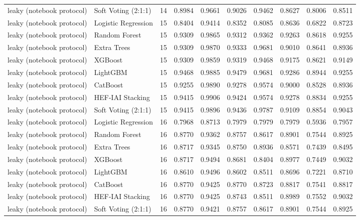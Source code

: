 \begin{tabular}{llrrrrrrrr}
leaky (notebook protocol) & Soft Voting (2:1:1) & 14 & 0.8984 & 0.9661 & 0.9026 & 0.9462 & 0.8627 & 0.8006 & 0.8511 \\
leaky (notebook protocol) & Logistic Regression & 15 & 0.8404 & 0.9414 & 0.8352 & 0.8085 & 0.8636 & 0.6822 & 0.8723 \\
leaky (notebook protocol) & Random Forest & 15 & 0.9309 & 0.9865 & 0.9312 & 0.9362 & 0.9263 & 0.8618 & 0.9255 \\
leaky (notebook protocol) & Extra Trees & 15 & 0.9309 & 0.9870 & 0.9333 & 0.9681 & 0.9010 & 0.8641 & 0.8936 \\
leaky (notebook protocol) & XGBoost & 15 & 0.9309 & 0.9859 & 0.9319 & 0.9468 & 0.9175 & 0.8621 & 0.9149 \\
leaky (notebook protocol) & LightGBM & 15 & 0.9468 & 0.9885 & 0.9479 & 0.9681 & 0.9286 & 0.8944 & 0.9255 \\
leaky (notebook protocol) & CatBoost & 15 & 0.9255 & 0.9890 & 0.9278 & 0.9574 & 0.9000 & 0.8528 & 0.8936 \\
leaky (notebook protocol) & HEF-IAI Stacking & 15 & 0.9415 & 0.9906 & 0.9424 & 0.9574 & 0.9278 & 0.8834 & 0.9255 \\
leaky (notebook protocol) & Soft Voting (2:1:1) & 15 & 0.9415 & 0.9896 & 0.9436 & 0.9787 & 0.9109 & 0.8854 & 0.9043 \\
leaky (notebook protocol) & Logistic Regression & 16 & 0.7968 & 0.8713 & 0.7979 & 0.7979 & 0.7979 & 0.5936 & 0.7957 \\
leaky (notebook protocol) & Random Forest & 16 & 0.8770 & 0.9362 & 0.8757 & 0.8617 & 0.8901 & 0.7544 & 0.8925 \\
leaky (notebook protocol) & Extra Trees & 16 & 0.8717 & 0.9345 & 0.8750 & 0.8936 & 0.8571 & 0.7439 & 0.8495 \\
leaky (notebook protocol) & XGBoost & 16 & 0.8717 & 0.9494 & 0.8681 & 0.8404 & 0.8977 & 0.7449 & 0.9032 \\
leaky (notebook protocol) & LightGBM & 16 & 0.8610 & 0.9496 & 0.8602 & 0.8511 & 0.8696 & 0.7221 & 0.8710 \\
leaky (notebook protocol) & CatBoost & 16 & 0.8770 & 0.9425 & 0.8770 & 0.8723 & 0.8817 & 0.7541 & 0.8817 \\
leaky (notebook protocol) & HEF-IAI Stacking & 16 & 0.8770 & 0.9425 & 0.8743 & 0.8511 & 0.8989 & 0.7552 & 0.9032 \\
leaky (notebook protocol) & Soft Voting (2:1:1) & 16 & 0.8770 & 0.9421 & 0.8757 & 0.8617 & 0.8901 & 0.7544 & 0.8925 \\

\end{tabular}
